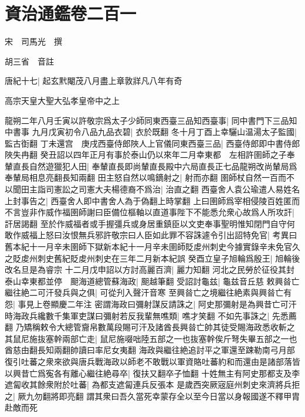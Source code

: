 \chapter{資治通鑑卷二百一}
宋　司馬光　撰

胡三省　音註

唐紀十七|{
	起玄黓閹茂八月盡上章敦牂凡八年有奇}


高宗天皇大聖大弘孝皇帝中之上

龍朔二年八月壬寅以許敬宗爲太子少師同東西臺三品知西臺事|{
	同中書門下三品知中書事}
九月戊寅初令八品九品衣碧|{
	衣於既翻}
冬十月丁酉上幸驪山温湯太子監國|{
	監古衘翻}
丁未還宫　庚戌西臺侍郎陜人上官儀同東西臺三品|{
	西臺侍郎即中書侍郎陜失冉翻}
癸丑詔以四年正月有事於泰山仍以來年二月幸東都　左相許圉師之子奉輦直長自然遊獵犯人田|{
	奉輦直長即尚輦直長殿中六局直長正七品龍朔改尚輦局爲奉輦局相息亮翻長知兩翻}
田主怒自然以鳴鏑射之|{
	射而亦翻}
圉師杖自然一百而不以聞田主詣司憲訟之司憲大夫楊德裔不爲治|{
	治直之翻}
西臺舍人袁公瑜遣人易姓名上封事告之|{
	西臺舍人即中書舍人為于偽翻上時掌翻}
上曰圉師爲宰相侵陵百姓匿而不言豈非作威作福圉師謝曰臣備位樞軸以直道事陛下不能悉允衆心故爲人所攻訐|{
	訐居謁翻}
至於作威福者或手握彊兵或身居重鎮臣以文吏奉事聖明惟知閉門自守何敢作威福上怒曰汝恨無兵邪許敬宗曰人臣如此罪不容誅遽令引出詔特免官|{
	考異曰舊本紀十一月辛未圉師下獄新本紀十一月辛未圉師貶䖍州刺史今據實錄辛未免官久之貶䖍州刺史舊紀貶䖍州刺史在三年二月新本紀誤}
癸酉立皇子旭輪爲殷王|{
	旭輪後改名旦是為睿宗}
十二月戊申詔以方討高麗百濟|{
	麗力知翻}
河北之民勞於征役其封泰山幸東都並停　䫻海道總管蘇海政|{
	䫻越筆翻}
受詔討龜兹|{
	龜兹音丘慈}
敕興㫺亡繼往絶二可汗發兵與之俱|{
	可從刋入聲汗音寒}
至興㫺亡之境繼往絶素與興㫺亡有怨|{
	事見上卷顯慶二年注}
密謂海政曰彌射謀反請誅之|{
	阿史那彌射是為興昔亡可汗}
時海政兵纔數千集軍吏謀曰彌射若反我輩無噍類|{
	噍才笑翻}
不如先事誅之|{
	先悉薦翻}
乃矯稱敕令大總管齎帛數萬段賜可汗及諸酋長興㫺亡帥其徒受賜海政悉收斬之其鼠尼施抜塞幹兩部亡走|{
	鼠尼施啜咄陸五部之一也抜塞幹俟斤弩失畢五部之一也酋慈由翻長知兩翻帥讀曰率尼女夷翻}
海政與繼往絶追討平之軍還至踈勒南弓月部復引吐蕃之衆來欲與唐兵戰海政以師老不敢戰以軍資賂吐蕃約和而還由是諸部落皆以興昔亡爲寃各有離心繼往絶尋卒|{
	復扶又翻卒子恤翻}
十姓無主有阿史那都支及李遮匐收其餘衆附於吐蕃|{
	為都支遮匐連兵反張本}
是歲西突厥宼庭州刺史來濟將兵拒之|{
	厥九勿翻將即亮翻}
謂其衆曰吾久當死幸蒙存全以至今日當以身報國遂不釋甲胄赴敵而死

